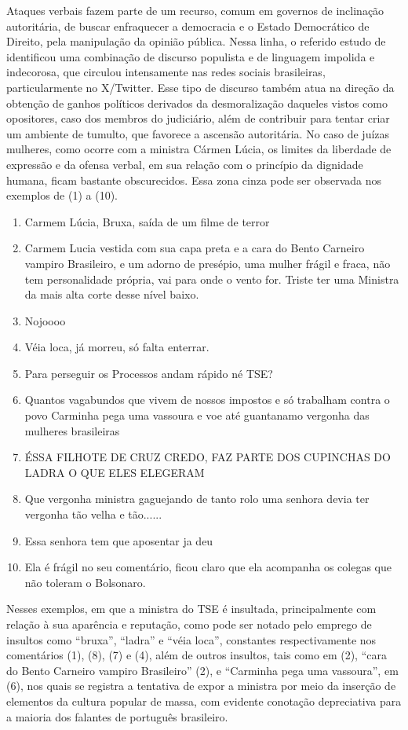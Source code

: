 \documentclass[portuguese]{textolivre}
\begin{document}
Ataques verbais fazem parte de um recurso, comum em governos de inclinação autoritária, de buscar enfraquecer a democracia e o Estado Democrático de Direito, pela manipulação da opinião pública. Nessa linha, o referido estudo de \textcite{oliveira2024} identificou uma combinação de discurso populista e de linguagem impolida e indecorosa, que circulou intensamente nas redes sociais brasileiras, particularmente no X/Twitter. Esse tipo de discurso também atua na direção da obtenção de ganhos políticos derivados da desmoralização daqueles vistos como opositores, caso dos membros do judiciário, além de contribuir para tentar criar um ambiente de tumulto, que favorece a ascensão autoritária. No caso de juízas mulheres, como ocorre com a ministra Cármen Lúcia, os limites da liberdade de expressão e da ofensa verbal, em sua relação com o princípio da dignidade humana, ficam bastante obscurecidos. Essa zona cinza pode ser observada nos exemplos de (1) a (10).
\medskip
\begin{enumerate}
    \item Carmem Lúcia, Bruxa, saída de um filme de terror
    \item Carmem Lucia vestida com sua capa preta e a cara do Bento Carneiro vampiro Brasileiro, e um adorno de presépio, uma mulher frágil e fraca, não tem personalidade própria, vai para onde o vento for. Triste ter uma Ministra da mais alta corte desse nível baixo.
    \item Nojoooo {\Symbola 🤮🤮🤮🤮}
    \item Véia loca, já morreu, só falta enterrar.
    \item Para perseguir os Processos andam rápido né TSE?
    \item Quantos vagabundos que vivem de nossos impostos e só trabalham contra o povo Carminha pega uma vassoura e voe até guantanamo vergonha das mulheres brasileiras
    \item ÉSSA FILHOTE DE CRUZ CREDO, FAZ PARTE DOS CUPINCHAS DO LADRA O QUE ELES ELEGERAM
    \item Que vergonha ministra gaguejando de tanto rolo uma senhora devia ter vergonha tão velha e tão......
    \item Essa senhora tem que aposentar ja deu
    \item Ela é frágil no seu comentário, ficou claro que ela acompanha os colegas que não toleram o Bolsonaro.
\end{enumerate}
\medskip

Nesses exemplos, em que a ministra do TSE é insultada, principalmente com relação à sua aparência e reputação, como pode ser notado pelo emprego de insultos como ``bruxa'', ``ladra'' e ``véia loca'', constantes respectivamente nos comentários (1), (8), (7) e (4), além de outros insultos, tais como em (2), ``cara do Bento Carneiro vampiro Brasileiro'' (2), e ``Carminha pega uma vassoura'', em (6), nos quais se registra a tentativa de expor a ministra por meio da inserção de  elementos da cultura popular de massa, com evidente conotação depreciativa para a maioria dos falantes de português brasileiro.
\end{document}
